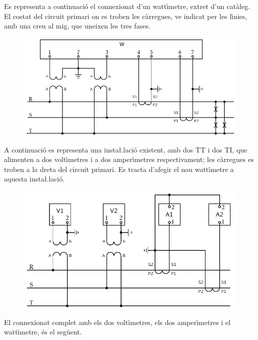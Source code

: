 \begin{exemple}

Es representa a continuaci\'{o} el connexionat d'un watt\'{\i}metre, extret
d'un cat\`{a}leg. El costat del circuit primari on es troben les c\`{a}rregues, ve indicat
per les l\'{\i}nies, amb una creu al mig, que uneixen les tres fases.
\begin{figure}[h]
\centering
    \includegraphics{Imatges/Cap-TrafosMesProt-Watt.pdf}
\end{figure}

A continuaci\'{o} es representa una insta{\l.l}aci\'{o} existent, amb dos TT i
dos TI, que alimenten a dos volt\'{\i}metres i a dos amper\'{\i}metres
respectivament; les c\`{a}rregues es troben a la dreta del circuit
primari. Es tracta d'afegir el nou watt\'{\i}metre a aquesta
insta{\l.l}aci\'{o}.

\begin{figure}[h]
\centering
    \includegraphics{Imatges/Cap-TrafosMesProt-Instal.pdf}
\end{figure}

El connexionat complet amb els dos volt\'{\i}metres, els dos amper\'{\i}metres i el watt\'{\i}metre, \'{e}s el seg\"{u}ent.


\end{exemple}
